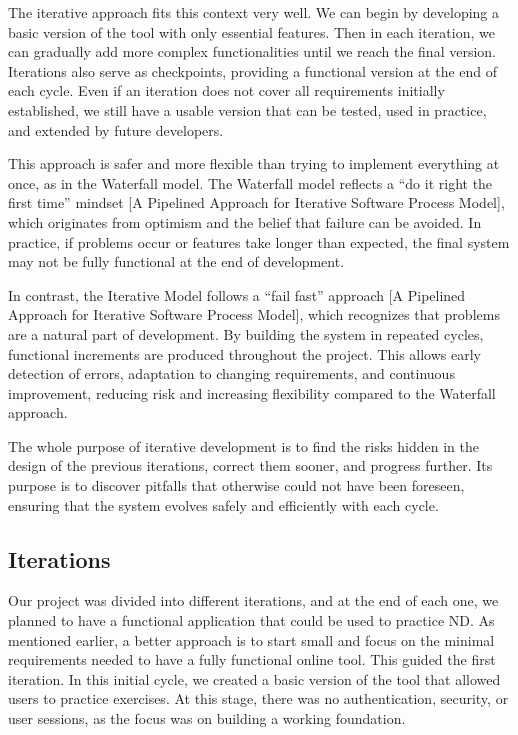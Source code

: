 The iterative approach fits this context very well. We can begin by developing a basic version of the tool with only essential features. Then in each iteration, we can gradually add more complex functionalities until we reach the final version. Iterations also serve as checkpoints, providing a functional version at the end of each cycle. Even if an iteration does not cover all requirements initially established, we still have a usable version that can be tested, used in practice, and extended by future developers.

This approach is safer and more flexible than trying to implement everything at once, as in the Waterfall model. The Waterfall model reflects a “do it right the first time” mindset [A Pipelined Approach for Iterative Software
Process Model], which originates from optimism and the belief that failure can be avoided. In practice, if problems occur or features take longer than expected, the final system may not be fully functional at the end of development.

In contrast, the Iterative Model follows a “fail fast” approach [A Pipelined Approach for Iterative Software Process Model], which recognizes that problems are a natural part of development. By building the system in repeated cycles, functional increments are produced throughout the project. This allows early detection of errors, adaptation to changing requirements, and continuous improvement, reducing risk and increasing flexibility compared to the Waterfall approach.

The whole purpose of iterative development is to find the risks hidden in the design of the previous iterations, correct them sooner, and progress further. Its purpose is to discover pitfalls that otherwise could not have been foreseen, ensuring that the system evolves safely and efficiently with each cycle.

\subsection{Iterations}
\label{it:iterations}
Our project was divided into different iterations, and at the end of each one, we planned to have a functional application that could be used to practice \gls{ND}. As mentioned earlier, a better approach is to start small and focus on the minimal requirements needed to have a fully functional online tool. This guided the first iteration. In this initial cycle, we created a basic version of the tool that allowed users to practice exercises. At this stage, there was no authentication, security, or user sessions, as the focus was on building a working foundation.

